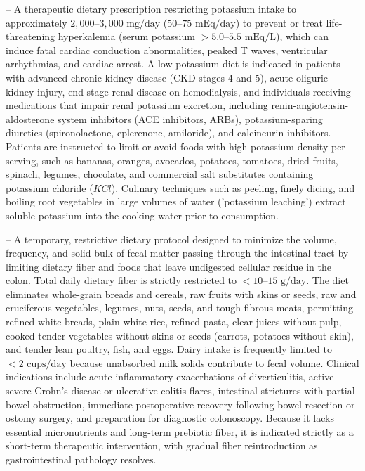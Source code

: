 -- A therapeutic dietary prescription restricting potassium intake to approximately $2{,}000\text{--}3{,}000\text{ mg/day}$ ($50\text{--}75\text{ mEq/day}$) to prevent or treat life-threatening hyperkalemia (serum potassium $>5.0\text{--}5.5\text{ mEq/L}$), which can induce fatal cardiac conduction abnormalities, peaked T waves, ventricular arrhythmias, and cardiac arrest. A low-potassium diet is indicated in patients with advanced chronic kidney disease (CKD stages 4 and 5), acute oliguric kidney injury, end-stage renal disease on hemodialysis, and individuals receiving medications that impair renal potassium excretion, including renin-angiotensin-aldosterone system inhibitors (ACE inhibitors, ARBs), potassium-sparing diuretics (spironolactone, eplerenone, amiloride), and calcineurin inhibitors. Patients are instructed to limit or avoid foods with high potassium density per serving, such as bananas, oranges, avocados, potatoes, tomatoes, dried fruits, spinach, legumes, chocolate, and commercial salt substitutes containing potassium chloride ($KCl$). Culinary techniques such as peeling, finely dicing, and boiling root vegetables in large volumes of water ('potassium leaching') extract soluble potassium into the cooking water prior to consumption.

-- A temporary, restrictive dietary protocol designed to minimize the volume, frequency, and solid bulk of fecal matter passing through the intestinal tract by limiting dietary fiber and foods that leave undigested cellular residue in the colon. Total daily dietary fiber is strictly restricted to $<10\text{--}15\text{ g/day}$. The diet eliminates whole-grain breads and cereals, raw fruits with skins or seeds, raw and cruciferous vegetables, legumes, nuts, seeds, and tough fibrous meats, permitting refined white breads, plain white rice, refined pasta, clear juices without pulp, cooked tender vegetables without skins or seeds (carrots, potatoes without skin), and tender lean poultry, fish, and eggs. Dairy intake is frequently limited to $<2\text{ cups/day}$ because unabsorbed milk solids contribute to fecal volume. Clinical indications include acute inflammatory exacerbations of diverticulitis, active severe Crohn's disease or ulcerative colitis flares, intestinal strictures with partial bowel obstruction, immediate postoperative recovery following bowel resection or ostomy surgery, and preparation for diagnostic colonoscopy. Because it lacks essential micronutrients and long-term prebiotic fiber, it is indicated strictly as a short-term therapeutic intervention, with gradual fiber reintroduction as gastrointestinal pathology resolves.

